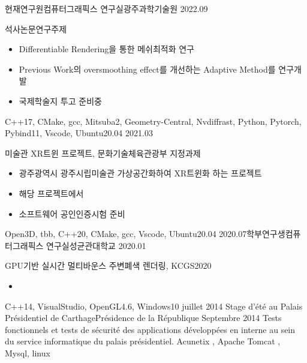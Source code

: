 %
%
%
\begin{experiences}
  \experience
{현재}{연구원}{컴퓨터그래픽스 연구실}{광주과학기술원}    
{2022.09} {석사논문연구주제
            \begin{itemize}
              \setlength\itemsep{0.2em}
              \item Differentiable Rendering을 통한 메쉬최적화 연구
              \item Previous Work의 oversmoothing effect를 개선하는 Adaptive Method를 연구개발 
              \item 국제학술지 투고 준비중              
            \end{itemize}
            }{C++17, CMake, gcc, Mitsuba2, Geometry-Central, Nvdiffrast, Python, Pytorch, Pybind11, Vscode, Ubuntu20.04}
  \emptySeparator
  \experience
    {}{}{}{}
    {2021.03} {미술관 XR트윈 프로젝트, 문화기술체육관광부 지정과제
                \begin{itemize}
                  \item 광주광역시 광주시립미술관 가상공간화하여 XR트윈화 하는 프로젝트
                  \item 해당 프로젝트에서 
                  \item 소프트웨어 공인인증시험 준비                        
                \end{itemize}
                }
                {Open3D, tbb, C++20, CMake, gcc, Vscode, Ubuntu20.04}
  \emptySeparator
  \experience
    {2020.07}{학부연구생}{컴퓨터그래픽스 연구실}{성균관대학교}
    {2020.01}{GPU기반 실시간 멀티바운스 주변폐색 렌더링, KCGS2020
              \begin{itemize}
                \item 
              \end{itemize}
              }{C++14, VisualStudio, OpenGL4.6, Windows10}
  \emptySeparator
 \experience
    {juillet 2014}   {Stage d’été }{au Palais Présidentiel de Carthage}{Présidence de la République}
    {Septembre 2014} {
                      Tests fonctionnels et tests de sécurité des applications développées en interne au sein du service informatique du palais présidentiel.
                    }
                    {Acunetix , Apache Tomcat , Mysql, linux}
  \emptySeparator
 

\end{experiences}
